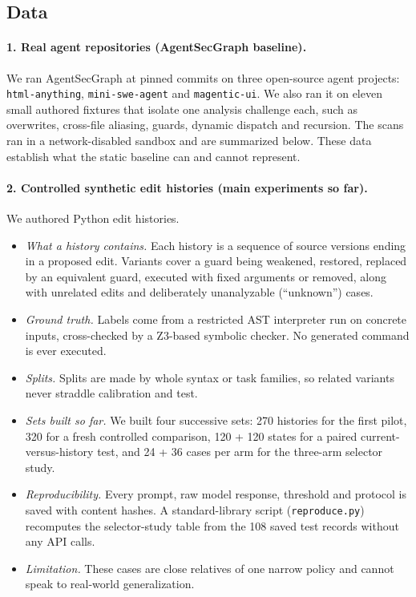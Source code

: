 \documentclass[11pt,letterpaper]{article}
\begin{document}
\subsection{Data}

\paragraph{1. Real agent repositories (AgentSecGraph baseline).} We ran AgentSecGraph at pinned commits on three open-source agent projects: \texttt{html-anything}, \texttt{mini-swe-agent} and \texttt{magentic-ui}. We also ran it on eleven small authored fixtures that isolate one analysis challenge each, such as overwrites, cross-file aliasing, guards, dynamic dispatch and recursion. The scans ran in a network-disabled sandbox and are summarized below. These data establish what the static baseline can and cannot represent.

\paragraph{2. Controlled synthetic edit histories (main experiments so far).} We authored Python edit histories.
\begin{itemize}
\item \emph{What a history contains.} Each history is a sequence of source versions ending in a proposed edit. Variants cover a guard being weakened, restored, replaced by an equivalent guard, executed with fixed arguments or removed, along with unrelated edits and deliberately unanalyzable (``unknown'') cases.
\item \emph{Ground truth.} Labels come from a restricted AST interpreter run on concrete inputs, cross-checked by a Z3-based symbolic checker. No generated command is ever executed.
\item \emph{Splits.} Splits are made by whole syntax or task families, so related variants never straddle calibration and test.
\item \emph{Sets built so far.} We built four successive sets: 270 histories for the first pilot, 320 for a fresh controlled comparison, 120 + 120 states for a paired current-versus-history test, and 24 + 36 cases per arm for the three-arm selector study.
\item \emph{Reproducibility.} Every prompt, raw model response, threshold and protocol is saved with content hashes. A standard-library script (\texttt{reproduce.py}) recomputes the selector-study table from the 108 saved test records without any API calls.
\item \emph{Limitation.} These cases are close relatives of one narrow policy and cannot speak to real-world generalization.
\end{itemize}
\end{document}
